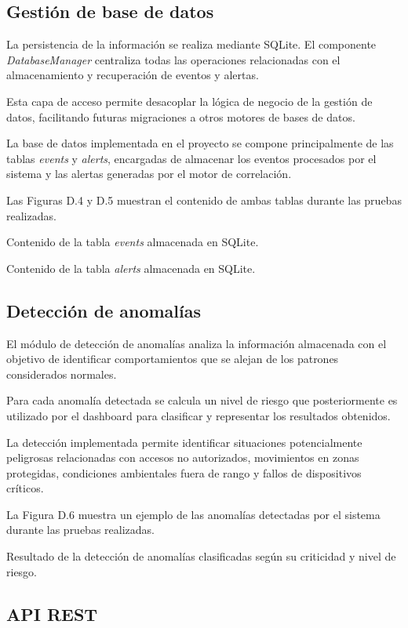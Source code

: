 \subsection{Gestión de base de datos}

La persistencia de la información se realiza mediante SQLite. El componente \textit{DatabaseManager} centraliza todas las operaciones relacionadas con el almacenamiento y recuperación de eventos y alertas.

Esta capa de acceso permite desacoplar la lógica de negocio de la gestión de datos, facilitando futuras migraciones a otros motores de bases de datos.

La base de datos implementada en el proyecto se compone principalmente de las tablas \textit{events} y \textit{alerts}, encargadas de almacenar los eventos procesados por el sistema y las alertas generadas por el motor de correlación.

Las Figuras D.4 y D.5 muestran el contenido de ambas tablas durante las pruebas realizadas.

{Contenido de la tabla \textit{events} almacenada en SQLite.}

{Contenido de la tabla \textit{alerts} almacenada en SQLite.}

\subsection{Detección de anomalías}

El módulo de detección de anomalías analiza la información almacenada con el objetivo de identificar comportamientos que se alejan de los patrones considerados normales.

Para cada anomalía detectada se calcula un nivel de riesgo que posteriormente es utilizado por el dashboard para clasificar y representar los resultados obtenidos.

La detección implementada permite identificar situaciones potencialmente peligrosas relacionadas con accesos no autorizados, movimientos en zonas protegidas, condiciones ambientales fuera de rango y fallos de dispositivos críticos.

La Figura D.6 muestra un ejemplo de las anomalías detectadas por el sistema durante las pruebas realizadas.

{Resultado de la detección de anomalías clasificadas según su criticidad y nivel de riesgo.}

\subsection{API REST}

